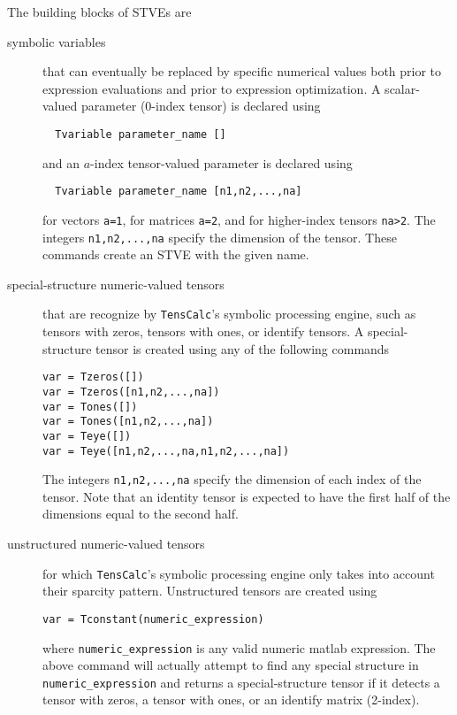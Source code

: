 \documentclass[11pt]{article}
\newcommand{\TC}{\texttt{TensCalc}}
\theoremstyle{remark}
\begin{document}
The building blocks of STVEs are
\begin{description}
\item[symbolic variables] that can eventually be replaced by specific
  numerical values both prior to expression evaluations and prior to
  expression optimization. A scalar-valued parameter ($0$-index tensor) is
  declared using
\begin{lstlisting}
  Tvariable parameter_name []
\end{lstlisting}
  and an $a$-index tensor-valued parameter is declared using
\begin{lstlisting}
  Tvariable parameter_name [n1,n2,...,na]
\end{lstlisting}
  for vectors \lstinline{a=1}, for matrices \lstinline{a=2}, and for
  higher-index tensors \lstinline{na>2}. The integers
  \lstinline{n1,n2,...,na} specify the dimension of the
  tensor. These commands create an STVE with the given name.

\item[special-structure numeric-valued tensors] that are recognize by \TC's symbolic
  processing engine, such as tensors with zeros, tensors with ones,
  or identify tensors. A special-structure tensor is created using any
  of the following commands
\begin{lstlisting}
var = Tzeros([])
var = Tzeros([n1,n2,...,na])
var = Tones([])
var = Tones([n1,n2,...,na])
var = Teye([])
var = Teye([n1,n2,...,na,n1,n2,...,na])
\end{lstlisting}
  The integers
  \lstinline{n1,n2,...,na} specify the dimension of each index of the
  tensor. Note that an identity tensor is expected to have the first
  half of the dimensions equal to the second half.

\item[unstructured numeric-valued tensors] for which \TC's symbolic processing engine
  only takes into account their sparcity pattern. Unstructured tensors
  are created using
\begin{lstlisting}
var = Tconstant(numeric_expression)
\end{lstlisting}
  where \lstinline{numeric_expression} is any valid numeric matlab
  expression. The above command will actually attempt to find any special
  structure in \lstinline{numeric_expression} and returns a
  special-structure tensor if it detects a tensor with zeros, a tensor
  with ones, or an identify matrix (2-index).


\end{description}
\end{document}
